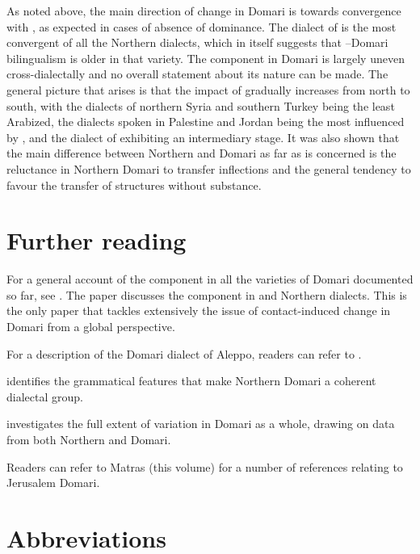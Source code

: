 \documentclass[output=paper]{langsci/langscibook}
\begin{document}
As noted above, the main direction of change in Domari is towards {convergence} with , as expected in cases of absence of dominance. The dialect of  is the most convergent of all the Northern dialects, which in itself suggests that --Domari {bilingualism} is older in that variety. The  component in Domari is largely uneven cross-dialectally and no overall statement about its nature can be made. The general picture that arises is that the impact of  gradually increases from north to south, with the dialects of northern Syria and southern Turkey being the least Arabized, the  dialects spoken in Palestine and Jordan being the most influenced by , and the dialect of  exhibiting an intermediary stage. It was also shown that the main difference between Northern and  Domari as far as  is concerned is the reluctance in Northern Domari to {transfer}  inflections and the general tendency to favour the {transfer} of structures without substance.

\section*{Further reading}\largerpage
\begin{furtherreading}
\item For a general account of the  component in all the varieties of Domari documented so far, see \citet{Herin2018}. The paper discusses the  component in  and Northern dialects. This is the only paper that tackles extensively the issue of contact-induced change in Domari from a global perspective.
\item For a description of the Domari dialect of Aleppo, readers can refer to \citet{Herin2012}.
\item \citet{Herin2014Domari} identifies the grammatical features that make Northern Domari a coherent dialectal group.
\item \citet{Herin2016} investigates the full extent of variation in Domari as a whole, drawing on data from both Northern and  Domari.
\item Readers can refer to Matras (this volume) for a number of references relating to {Jerusalem Domari}.
\end{furtherreading}

\section*{Abbreviations}
\end{document}
